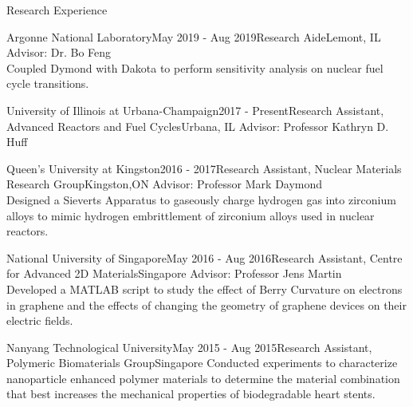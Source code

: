 \documentclass{resume2} %
\begin{document}

\begin{rSection}{Research Experience}

\begin{rSubsection}{Argonne National Laboratory}{May 2019 - Aug 2019}{Research Aide}{Lemont, IL}
Advisor: Dr. Bo Feng \\ 
Coupled Dymond with Dakota to perform sensitivity analysis on nuclear fuel cycle transitions.
\end{rSubsection}

\begin{rSubsection}{University of Illinois at Urbana-Champaign}{2017 - Present}{Research Assistant, Advanced Reactors and Fuel Cycles}{Urbana, IL}
Advisor: Professor Kathryn D. Huff 
\end{rSubsection}


\begin{rSubsection}{Queen's University at Kingston}{2016 - 2017}{Research Assistant, Nuclear Materials Research Group}{Kingston,ON}
Advisor: Professor Mark Daymond \\
Designed a Sieverts Apparatus to gaseously charge hydrogen gas into zirconium alloys to 
mimic hydrogen embrittlement of zirconium alloys used in nuclear reactors.
\iffalse
The design is being implemented at Reactor Materials Testing Laboratory to test how hydrogen embrittled zirconium alloys respond in nuclear reactor conditions
 Application to nuclear industry: zirconium alloys used in nuclear reactors succumb to hydrogen embrittlement during its lifetime, therefore, it is important to be able to replicate the conditions in nuclear reactors, so as to study its end-of-life conditions
\fi
\end{rSubsection}

\begin{rSubsection}{National University of Singapore}{May 2016 - Aug 2016}{Research Assistant, Centre for Advanced 2D Materials}{Singapore}
Advisor: Professor Jens Martin \\	 
Developed a MATLAB script to study the effect of Berry Curvature on electrons in graphene and the 
effects of changing the geometry of graphene devices on their electric fields. 
\iffalse
Both programs were used to assist graduate students in their design of nano-graphene devices
\fi
\end{rSubsection}

\begin{rSubsection}{Nanyang Technological University}{May 2015 - Aug 2015}{Research Assistant, Polymeric Biomaterials Group}{Singapore}
Conducted experiments to characterize nanoparticle enhanced polymer materials to determine the material 
combination that best increases the mechanical properties of biodegradable heart stents.  
\end{rSubsection}

\end{rSection}
\end{document}
